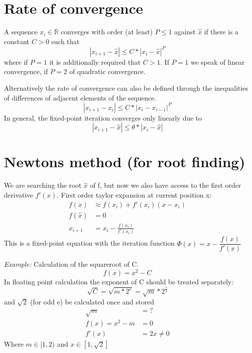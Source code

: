 \section{Rate of convergence}\label{sec:rate-of-convergence}
A sequence $x_i \in \mathbb{R}$ converges with order (at least) $P \leq 1$ against $\hat{x}$ if there is a constant $C>0$ such that
\begin{equation*}
    |x_{i+1}-\hat{x}| \leq C * |x_i-\hat{x}|^P
\end{equation*}
where if $P=1$ it is additionally required that $C>1$.
If $P=1$ we speak of linear convergence, if $P=2$ of quadratic convergence.

Alternatively the rate of convergence can also be defined through the inequalities of differences of adjacent elements of the sequence.
\begin{equation*}
    |x_{i+1}-x_i| \leq C * |x_i-x_{i-1}|^P
\end{equation*}
In general, the fixed-point iteration converges only linearly due to
\begin{equation*}
    |x_{i+1}-\hat{x}| \leq \theta * |x_i-\hat{x}|
\end{equation*}


\section{Newtons method (for root finding)}\label{sec:newtons-method-(for-root-finding)}
We are searching the root $\hat{x}$ of f, but now we also have access to the first order derivative $f'(x)$.
First order taylor expansion at current position x:
\begin{align*}
    f(x) &\approx f(x_i)+ f'(x_i)(x-x_i)\\
    f(\hat{x}) &= 0\\
    x_{i+1} &= x_i - \frac{f(x_i)}{f'(x_i)}
\end{align*}
This is a fixed-point equation with the iteration function $\Phi(x)= x - \dfrac{f(x)}{f'(x)}$

\vspace{10mm}

\emph{Example:} Calculation of the squareroot of C\@.
\begin{equation*}
    f(x)=x^2-C
\end{equation*}
In floating point calculation the exponent of C should be treated separately:
\begin{equation*}
    \sqrt {C} = \sqrt {m * 2^e} = \sqrt {m} * 2^{\frac{e}{2}}
\end{equation*}
and $\sqrt{2}$ (for odd e) be calculated once and stored
\begin{align*}
    \sqrt {m} &= ? \\
    f(x) = x^2-m &= 0 \\
    f'(x) &= 2x \neq 0
\end{align*}
Where $m\in[1,2)$ and $x \in \left[1, \sqrt{2}\right]$

